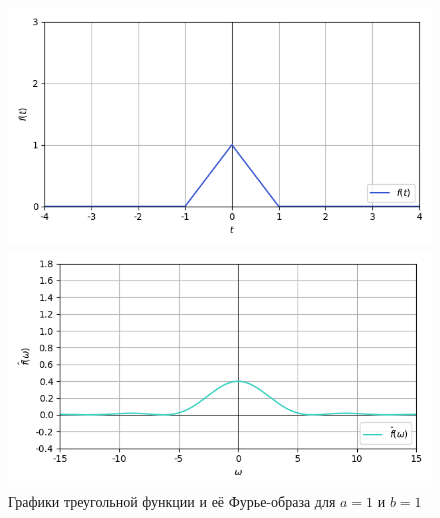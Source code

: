 \documentclass[a4paper]{article}
\begin{document}
\begin{figure}[H]
    \begin{minipage}{0.5\textwidth}
        \centering \includegraphics[width=\textwidth]{sources/2_triangular/graph_1.png}
    \end{minipage}\hfill
    \begin{minipage}{0.5\textwidth}
        \centering \includegraphics[width=\textwidth]{sources/2_triangular/fourier_1.png}
    \end{minipage}
    \caption{Графики треугольной функции и её Фурье-образа для $a = 1$ и $b = 1$} 
\end{figure}
\end{document}

